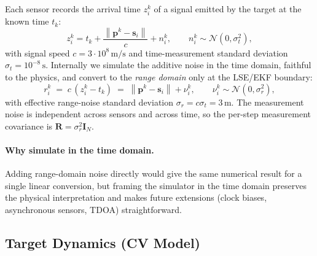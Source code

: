 \documentclass[11pt,a4paper]{article}
\newcommand{\norm}[1]{\left\lVert #1 \right\rVert}
\begin{document}
Each sensor records the arrival time $z_i^k$ of a signal emitted by the
target at the known time $t_k$:
\begin{equation}
  z_i^k = t_k + \frac{\norm{\mathbf{p}^k - \mathbf{s}_i}}{c} + n_i^k,
  \qquad n_i^k \sim \mathcal{N}(0, \sigma_t^2),
  \label{eq:toa}
\end{equation}
with signal speed $c = 3 \cdot 10^8\,\mathrm{m/s}$ and time-measurement
standard deviation $\sigma_t = 10^{-8}\,\mathrm{s}$.  Internally we simulate
the additive noise in the time domain, faithful to the physics, and convert
to the \emph{range domain} only at the LSE/EKF boundary:
\begin{equation}
  r_i^k \;=\; c \,(z_i^k - t_k)
  \;=\; \norm{\mathbf{p}^k - \mathbf{s}_i} + \nu_i^k,
  \qquad \nu_i^k \sim \mathcal{N}(0, \sigma_r^2),
  \label{eq:range}
\end{equation}
with effective range-noise standard deviation $\sigma_r = c\sigma_t =
3\,\mathrm{m}$.  The measurement noise is independent across sensors and
across time, so the per-step measurement covariance is
$\mathbf{R} = \sigma_r^2 \mathbf{I}_N$.

\paragraph{Why simulate in the time domain.}
Adding range-domain noise directly would give the same numerical result for
a single linear conversion, but framing the simulator in the time domain
preserves the physical interpretation and makes future extensions (clock
biases, asynchronous sensors, TDOA) straightforward.

\subsection{Target Dynamics (CV Model)}
\end{document}
